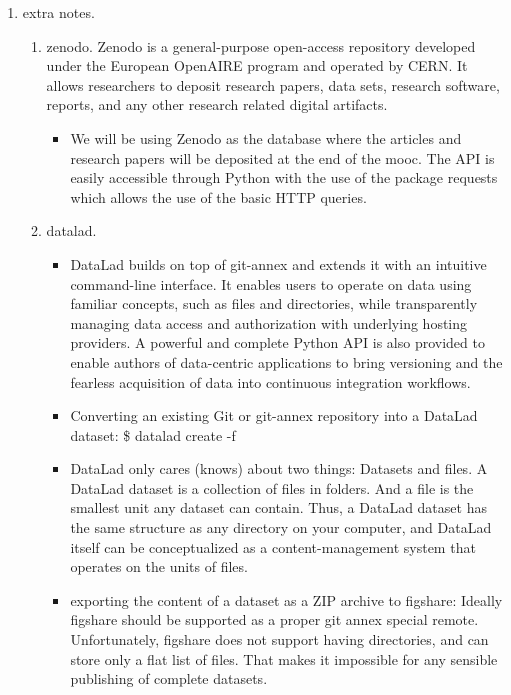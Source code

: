 \documentclass[11pt]{article}
\begin{document}
\begin{enumerate}
\item extra notes.
\label{sec:org4b0a97c}
\begin{enumerate}
\item zenodo.
\label{sec:orgcb18165}
Zenodo is a general-purpose open-access repository developed under
the European OpenAIRE program and operated by CERN. It allows
researchers to deposit research papers, data sets, research
software, reports, and any other research related digital artifacts.
\begin{itemize}
\item We will be using Zenodo as the database where the articles and
research papers will be deposited at the end of the mooc. The API
is easily accessible through Python with the use of the package
requests which allows the use of the basic HTTP queries.
\end{itemize}
\item datalad.
\label{sec:org690f26b}
\begin{itemize}
\item DataLad builds on top of git-annex and extends it with an
intuitive command-line interface. It enables users to operate
on data using familiar concepts, such as files and directories,
while transparently managing data access and authorization with
underlying hosting providers.
A powerful and complete Python API is also provided to enable
authors of data-centric applications to bring versioning and the
fearless acquisition of data into continuous integration workflows.
\item Converting an existing Git or git-annex repository into a
DataLad dataset: 	\$ datalad create -f
\item DataLad only cares (knows) about two things: Datasets and
files. A DataLad dataset is a collection of files in
folders. And a file is the smallest unit any dataset can
contain. Thus, a DataLad dataset has the same structure as any
directory on your computer, and DataLad itself can be
conceptualized as a content-management system that operates on
the units of files.
\item exporting the content of a dataset as a ZIP archive to figshare:
Ideally figshare should be supported as a proper git annex special
remote. Unfortunately, figshare does not support having directories,
and can store only a flat list of files. That makes it impossible
for any sensible publishing of complete datasets.
\end{itemize}
\end{enumerate}
\end{enumerate}
\end{document}
